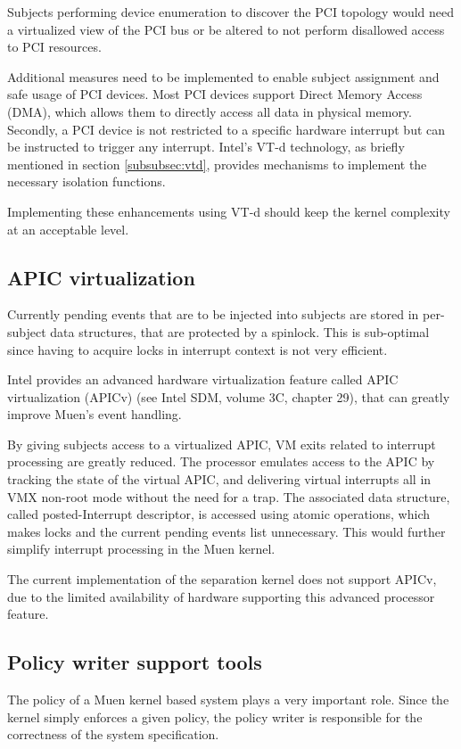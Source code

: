 Subjects performing device enumeration to discover the PCI topology would need
a virtualized view of the PCI bus or be altered to not perform disallowed access
to PCI resources.

Additional measures need to be implemented to enable subject assignment and safe
usage of PCI devices. Most PCI devices support Direct Memory Access (DMA), which
allows them to directly access all data in physical memory. Secondly, a PCI
device is not restricted to a specific hardware interrupt but can be instructed
to trigger any interrupt. Intel's VT-d technology, as briefly mentioned in
section \ref{subsubsec:vtd}, provides mechanisms to implement the necessary
isolation functions.

Implementing these enhancements using VT-d should keep the kernel complexity at
an acceptable level.

\subsection{APIC virtualization}\label{subsec:apicv}
Currently pending events that are to be injected into subjects are stored in
per-subject data structures, that are protected by a spinlock. This is
sub-optimal since having to acquire locks in interrupt context is not very
efficient.

Intel provides an advanced hardware virtualization feature called APIC
virtualization (APICv) (see Intel SDM, volume 3C, chapter 29), that can greatly
improve Muen's event handling.

By giving subjects access to a virtualized APIC, VM exits related to interrupt
processing are greatly reduced. The processor emulates access to the APIC by
tracking the state of the virtual APIC, and delivering virtual interrupts all in
VMX non-root mode without the need for a trap. The associated data structure,
called posted-Interrupt descriptor, is accessed using atomic operations, which
makes locks and the current pending events list unnecessary. This would further
simplify interrupt processing in the Muen kernel.

The current implementation of the separation kernel does not support APICv, due
to the limited availability of hardware supporting this advanced processor
feature.

\subsection{Policy writer support tools}
The policy of a Muen kernel based system plays a very important role. Since the
kernel simply enforces a given policy, the policy writer is responsible for the
correctness of the system specification.

